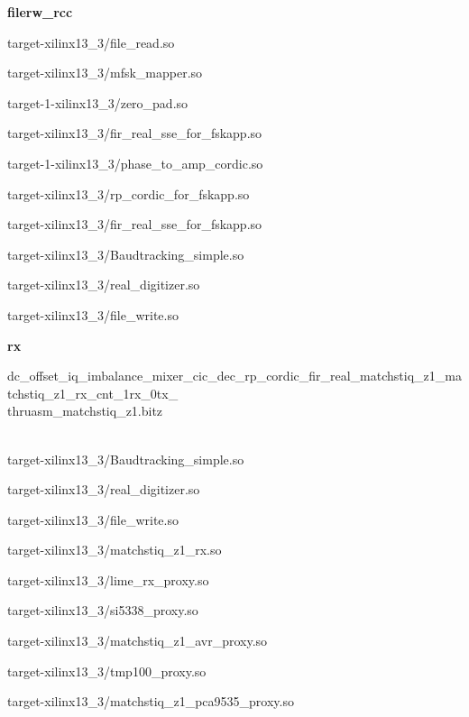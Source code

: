 \begin{appendices}
	\textbf{filerw\_rcc}
	\begin{itemize}
	\begin{minipage}[t]{.5\textwidth}
	\item target-xilinx13\_3/file\_read.so
	\item target-xilinx13\_3/mfsk\_mapper.so
	\item target-1-xilinx13\_3/zero\_pad.so
	\item target-xilinx13\_3/fir\_real\_sse\_for\_fskapp.so
	\item target-1-xilinx13\_3/phase\_to\_amp\_cordic.so
	\end{minipage}
	\begin{minipage}[t]{.5\textwidth}
	\item target-xilinx13\_3/rp\_cordic\_for\_fskapp.so
	\item target-xilinx13\_3/fir\_real\_sse\_for\_fskapp.so
	\item target-xilinx13\_3/Baudtracking\_simple.so
	\item target-xilinx13\_3/real\_digitizer.so
	\item target-xilinx13\_3/file\_write.so
	\end{minipage}
	\end{itemize}

	\textbf{rx}
	\begin{itemize}
	\item dc\_offset\_iq\_imbalance\_mixer\_cic\_dec\_rp\_cordic\_fir\_real\_matchstiq\_z1\_matchstiq\_z1\_rx\_cnt\_1rx\_0tx\_ \\ thruasm\_matchstiq\_z1.bitz \\ \\
	\begin{minipage}[t]{.5\textwidth}\item target-xilinx13\_3/Baudtracking\_simple.so
	\item target-xilinx13\_3/real\_digitizer.so
	\item target-xilinx13\_3/file\_write.so
	\item target-xilinx13\_3/matchstiq\_z1\_rx.so
	\item target-xilinx13\_3/lime\_rx\_proxy.so
	\end{minipage}
	\begin{minipage}[t]{.5\textwidth}	\item target-xilinx13\_3/si5338\_proxy.so
	\item target-xilinx13\_3/matchstiq\_z1\_avr\_proxy.so
	\item target-xilinx13\_3/tmp100\_proxy.so
	\item target-xilinx13\_3/matchstiq\_z1\_pca9535\_proxy.so
	\end{minipage}
	\end{itemize}


\end{appendices}

